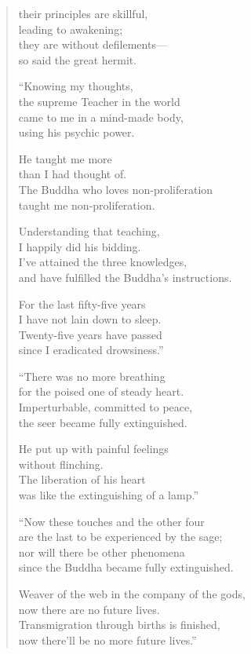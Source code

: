 \documentclass[12pt,openany]{book}%
\begin{document}
\begin{verse}
their principles are skillful, \\
leading to awakening; \\
they are without defilements—\\
so said the great hermit. 

“Knowing my thoughts, \\
the supreme Teacher in the world \\
came to me in a mind-made body, \\
using his psychic power. 

He taught me more \\
than I had thought of. \\
The Buddha who loves non-proliferation \\
taught me non-proliferation. 

Understanding that teaching, \\
I happily did his bidding. \\
I’ve attained the three knowledges, \\
and have fulfilled the Buddha’s instructions. 

For the last fifty-five years \\
I have not lain down to sleep. \\
Twenty-five years have passed \\
since I eradicated drowsiness.” 

“There was no more breathing \\
for the poised one of steady heart. \\
Imperturbable, committed to peace, \\
the seer became fully extinguished. 

He put up with painful feelings \\
without flinching. \\
The liberation of his heart \\
was like the extinguishing of a lamp.” 

“Now these touches and the other four \\
are the last to be experienced by the sage; \\
nor will there be other phenomena \\
since the Buddha became fully extinguished. 

Weaver of the web in the company of the gods, \\
now there are no future lives. \\
Transmigration through births is finished, \\
now there’ll be no more future lives.” 


\end{verse}
\end{document}
